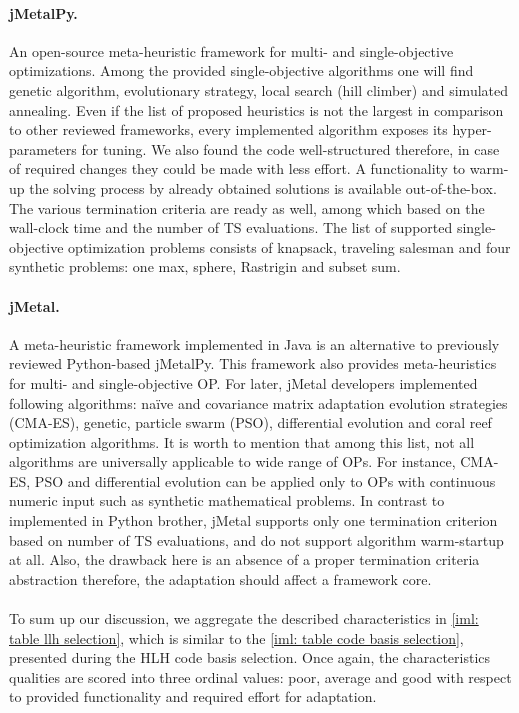 \paragraph{jMetalPy.} An open-source meta-heuristic framework for multi- and single-objective optimizations. Among the provided single-objective algorithms one will find genetic algorithm, evolutionary strategy, local search (hill climber) and simulated annealing. Even if the list of proposed heuristics is not the largest in comparison to other reviewed frameworks, every implemented algorithm exposes its hyper-parameters for tuning. We also found the code well-structured therefore, in case of required changes they could be made with less effort. A functionality to warm-up the solving process by already obtained solutions is available out-of-the-box. The various termination criteria are ready as well, among which based on the wall-clock time and the number of TS evaluations. The list of supported single-objective optimization problems consists of knapsack, traveling salesman and four synthetic problems: one max, sphere, Rastrigin and subset sum.

\paragraph{jMetal.} A meta-heuristic framework implemented in Java is an alternative to previously reviewed Python-based jMetalPy. This framework also provides meta-heuristics for multi- and single-objective OP. For later, jMetal developers implemented following algorithms:  na\"ive and covariance matrix adaptation evolution strategies (CMA-ES), genetic, particle swarm (PSO), differential evolution and coral reef optimization algorithms. It is worth to mention that among this list, not all algorithms are universally applicable to wide range of OPs. For instance, CMA-ES, PSO and differential evolution can be applied only to OPs with continuous numeric input such as synthetic mathematical problems. In contrast to implemented in Python brother, jMetal supports only one termination criterion based on number of TS evaluations, and do not support algorithm warm-startup at all. Also, the drawback here is an absence of a proper termination criteria abstraction therefore, the adaptation should affect a framework core.

\paragraph{} To sum up our discussion, we aggregate the described characteristics in \cref{iml: table llh selection}, which is similar to the \cref{iml: table code basis selection}, presented during the HLH code basis selection. Once again, the characteristics qualities are scored into three ordinal values: poor, average and good with respect to provided functionality and required effort for adaptation.

